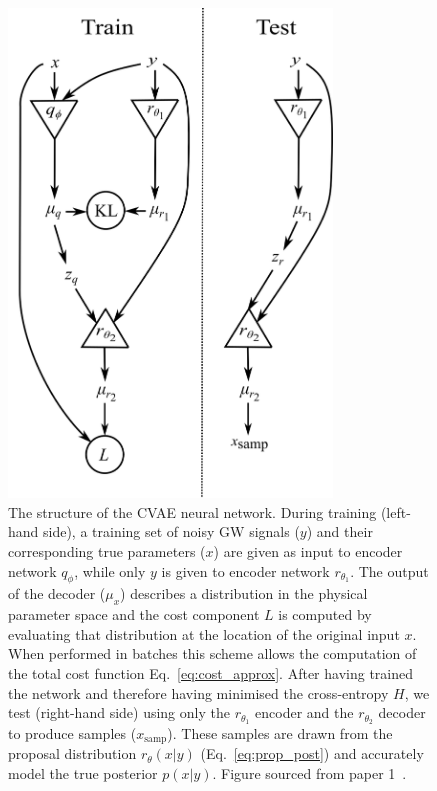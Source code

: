 \documentclass[aps,superscriptaddress,twocolumn,nopreprintnumbers,floatfix,groupedaddress]{revtex4-1}
\newcommand{\figwidth}{8.6cm}
\begin{document}
%
%
%
%
\begin{figure}
	\centering
	\includegraphics[width=\figwidth]{figs/network_setup.png}
	\caption{The structure of the \ac{CVAE}
		neural network. During training (left-hand side), a training set of noisy
		\ac{GW} signals ($y$) and their corresponding true parameters ($x$) are given
		as input to encoder network $q_{\phi}$, while only $y$ is given to
		encoder network $r_{\theta_1}$. The output of the decoder ($\mu_x$) describes a distribution in
		the physical parameter space and the cost component $L$ is computed by
		evaluating that distribution at the location of the original input $x$.
		When performed in batches this scheme allows the computation of the total cost
		function Eq.~\ref{eq:cost_approx}. After having trained the network and
		therefore having minimised the cross-entropy $H$, we test (right-hand side)
		using only the $r_{\theta_1}$ encoder and the $r_{\theta_2}$
		decoder to produce samples ($x_{\text{samp}}$). These samples are drawn
		from the proposal distribution $r_{\theta}(x|y)$ (Eq.~\ref{eq:prop_post})
		and accurately model the true posterior $p(x|y)$. Figure sourced from paper 1~\cite{vitpaper}.}
	\label{fig:vit_flow}
\end{figure}
\end{document}
